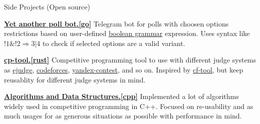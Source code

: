 \begin{rSection}{Side Projects (Open source)}
    \vspace{-1.25em}
    \item \href{https://github.com/dendi239/yet-another-poll-bot}{\textbf{Yet another poll bot.[go]}} {
    Telegram bot for polls with choosen options restrictions based on user-defined \href{https://en.wikipedia.org/wiki/Boolean_grammar}{boolean grammar} expression.
    Uses syntax like $!1 \& !2 \Rightarrow 3 | 4$ to check if selected options are a valid variant.
    }
    \item \href{https://github.com/dendi239/cp-tool}{\textbf{cp-tool.[rust]}} {
    Competitive programming tool to use with different judge systems as \href{https://ejudge.ru}{ejudge}, \href{https://codeforces.com}{codeforces}, \href{https://contest.yandex.ru}{yandex-contest}, and so on.
    Inspired by \href{https://github.com/xalanq/cf-tool}{cf-tool}, but keep reusablity for different judge systems in mind.
    }
    \item \href{https://github.com/dendi239/algorithms-data-structures}{\textbf{Algorithms and Data Structures.[cpp]}} {
    Implemented a lot of algorithms widely used in competitive programming in C++. Focused on re-usability and as much usages for as generous situations as possible with performance in mind.
    }
\end{rSection}
